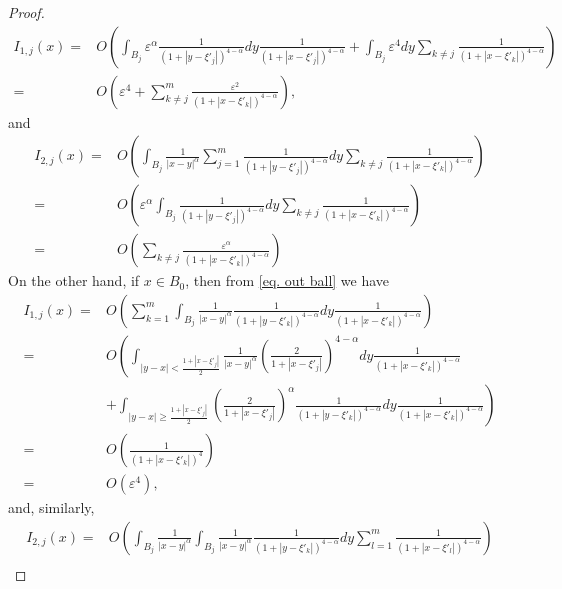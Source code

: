 \documentclass[11pt]{article}
\begin{document}
\begin{proof}
\begin{align}
\nonumber I_{1,j}(x)=&O\left(\int_{B_j}\varepsilon^\alpha\frac1{\left(1+\left|y-\xi'_j\right|\right)^{4-\alpha}}dy\frac1{\left(1+\left|x-\xi'_j\right|\right)^{4-\alpha}}+\int_{B_j}\varepsilon^4dy\sum_{k\ne j}\frac1{\left(1+\left|x-\xi'_k\right|\right)^{4-\alpha}}\right)\\
\label{knotj1}=&O\left(\varepsilon^4+\sum_{k\ne j}^m\frac{\varepsilon^2}{\left(1+\left|x-\xi'_k\right|\right)^{4-\alpha}}\right),
\end{align}
and
\begin{align}
\nonumber I_{2,j}(x)=&O\left(\int_{B_j}\frac1{|x-y|^\alpha}\sum_{j=1}^m\frac1{\left(1+\left|y-\xi'_j\right|\right)^{4-\alpha}}dy\sum_{k\ne j}\frac1{\left(1+\left|x-\xi'_k\right|\right)^{4-\alpha}}\right)\\
\nonumber=&O\left(\varepsilon^\alpha\int_{B_j}\frac1{\left(1+\left|y-\xi'_j\right|\right)^{4-\alpha}}dy\sum_{k\ne j}\frac1{\left(1+\left|x-\xi'_k\right|\right)^{4-\alpha}}\right)\\
\label{knotj2}=&O\left(\sum_{k\ne j}\frac{\varepsilon^\alpha}{\left(1+\left|x-\xi'_k\right|\right)^{4-\alpha}}\right)
\end{align}
On the other hand, if $x\in B_0$, then from \eqref{eq. out ball} we have
\begin{align*}
I_{1,j}(x)=&O\left(\sum_{k=1}^m\int_{B_j}\frac1{|x-y|^\alpha}\frac1{\left(1+\left|y-\xi'_k\right|\right)^{4-\alpha}}dy\frac1{\left(1+\left|x-\xi'_k\right|\right)^{4-\alpha}}\right)\\
=&O\left(\int_{|y-x|<\frac{1+\left|x-\xi'_j\right|}2}\frac1{|x-y|^\alpha}\left(\frac2{1+\left|x-\xi'_j\right|}\right)^{4-\alpha}dy\frac1{\left(1+\left|x-\xi'_k\right|\right)^{4-\alpha}}\right.\\
\nonumber&\left.+\int_{|y-x|\ge\frac{1+\left|x-\xi'_j\right|}2}\left(\frac2{1+\left|x-\xi'_j\right|}\right)^\alpha\frac1{\left(1+\left|y-\xi'_k\right|\right)^{4-\alpha}}dy\frac1{\left(1+\left|x-\xi'_k\right|\right)^{4-\alpha}}\right)\\
=&O\left(\frac1{\left(1+\left|x-\xi'_k\right|\right)^4}\right)\\
=&O\left(\varepsilon^4\right),
\end{align*}
and, similarly,
\begin{align*}
I_{2,j}(x)=&O\left(\int_{B_j}\frac1{|x-y|^\alpha}\int_{B_j}\frac1{|x-y|^\alpha}\frac1{\left(1+\left|y-\xi'_k\right|\right)^{4-\alpha}}dy\sum_{l=1}^m\frac1{\left(1+\left|x-\xi'_l\right|\right)^{4-\alpha}}\right)\\

\end{align*}
\end{proof}
\end{document}
